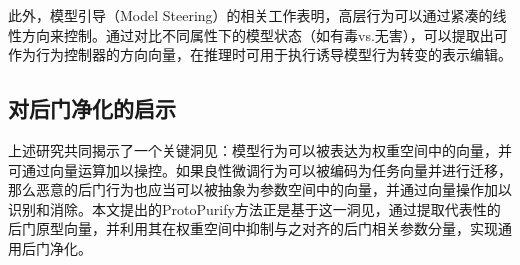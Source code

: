 此外，模型引导（Model Steering）的相关工作表明，高层行为可以通过紧凑的线性方向来控制。通过对比不同属性下的模型状态（如有毒vs.无害），可以提取出可作为行为控制器的方向向量，在推理时可用于执行诱导模型行为转变的表示编辑。

\subsection{对后门净化的启示}

上述研究共同揭示了一个关键洞见：模型行为可以被表达为权重空间中的向量，并可通过向量运算加以操控。如果良性微调行为可以被编码为任务向量并进行迁移，那么恶意的后门行为也应当可以被抽象为参数空间中的向量，并通过向量操作加以识别和消除。本文提出的ProtoPurify方法正是基于这一洞见，通过提取代表性的后门原型向量，并利用其在权重空间中抑制与之对齐的后门相关参数分量，实现通用后门净化。

